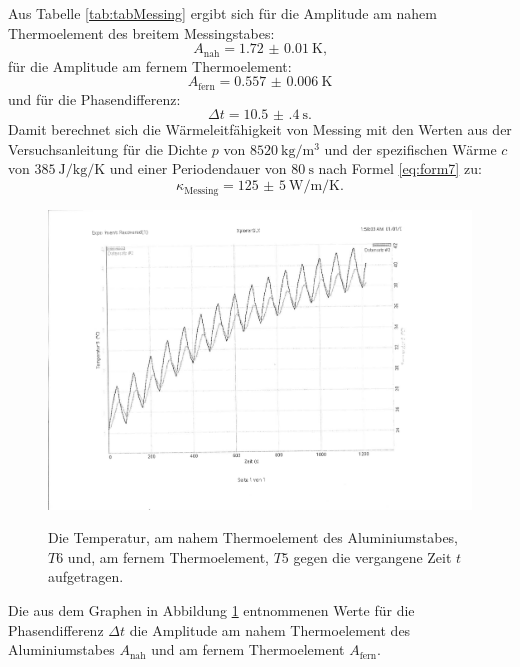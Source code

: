 Aus Tabelle \ref{tab:tabMessing} ergibt sich für die Amplitude am nahem Thermoelement des breitem Messingstabes:
\begin{displaymath}
A_\text{nah} = \SI{1.72(1)}{\kelvin}\text{,}
\end{displaymath}
für die Amplitude am fernem Thermoelement:
\begin{displaymath}
A_\text{fern} = \SI{0.557(6)}{\kelvin}
\end{displaymath}
und für die Phasendifferenz:
\begin{displaymath}
\Delta t = \SI{10.5(4)}{\second}\text{.}
\end{displaymath}
Damit berechnet sich die Wärmeleitfähigkeit von Messing mit den Werten aus der Versuchsanleitung \cite{V204} für die Dichte $p$ von $\SI{8520}{\kilo\gram\per\meter\tothe{3}}$ und der spezifischen Wärme $c$ von $\SI{385}{\joule\per\kilo\gram\per\kelvin}$ und einer Periodendauer von $\SI{80}{\second}$ nach Formel \eqref{eq:form7} zu:
\begin{displaymath}
\kappa_\text{Messing} = \SI{125(5)}{\watt\per\meter\per\kelvin}\text{.}
\end{displaymath}
\begin{figure}
	\centering
	\caption{Die Temperatur, am nahem Thermoelement des Aluminiumstabes, $T6$ und, am fernem Thermoelement, $T5$ gegen die vergangene Zeit $t$ aufgetragen.}
	\includegraphics[width=\linewidth-70pt,height=\textheight-70pt,keepaspectratio]{content/Bilder/T5T6-rotated.pdf}
	\label{fig:Graph6}
\end{figure}
\begin{table}
	\centering
	\caption{Die aus dem Graphen in Abbildung \ref{fig:Graph6} entnommenen Werte für die Phasendifferenz $\Delta t$ die Amplitude am nahem Thermoelement des Aluminiumstabes $A_\text{nah}$ und am fernem Thermoelement $A_\text{fern}$.}
	
\end{table}

